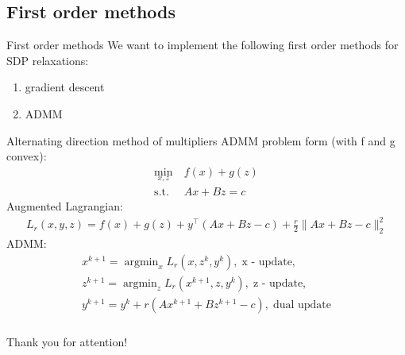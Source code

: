 \documentclass[10pt]{beamer}
\newcommand{\argmin}{\mathop{\mathrm{argmin}}}
\begin{document}
    \subsection{First order methods}
        \begin{frame}{First order methods}
            We want to implement the following first order methods for SDP relaxations:
            \begin{enumerate}
                \item gradient descent
                \item ADMM
            \end{enumerate}
            
        \end{frame}
        
        \begin{frame}{Alternating direction method of multipliers}
            ADMM problem form (with f and g convex):
            \begin{align*}
                \min_{x, z} &~f(x) + g(z)\\
                \text{s.t.} &~Ax + Bz = c
            \end{align*}
            Augmented Lagrangian:
            \begin{align*}
                L_r(x,y,z)=f(x) + g(z) + y^{\top}(Ax + Bz - c) + \frac{r}{2}\| Ax + Bz - c\|^2_2
            \end{align*}
            ADMM:
            \begin{gather*}
                x^{k+1}=\argmin_x L_r (x, z^k, y^k), \; \text{x - update},\\
                z^{k+1}=\argmin_z L_r (x^{k+1}, z, y^k), \; \text{z - update},\\
                y^{k+1}=y^k + r (Ax^{k+1} + Bz^{k+1} - c), \; \text{dual update}
            \end{gather*}
            
        \end{frame}
		
	
	\begin{frame}
		\frametitle{}
		
		\begin{center}
			{\LARGE Thank you for attention!}
		\end{center}
		
	\end{frame}
	
\end{document}
